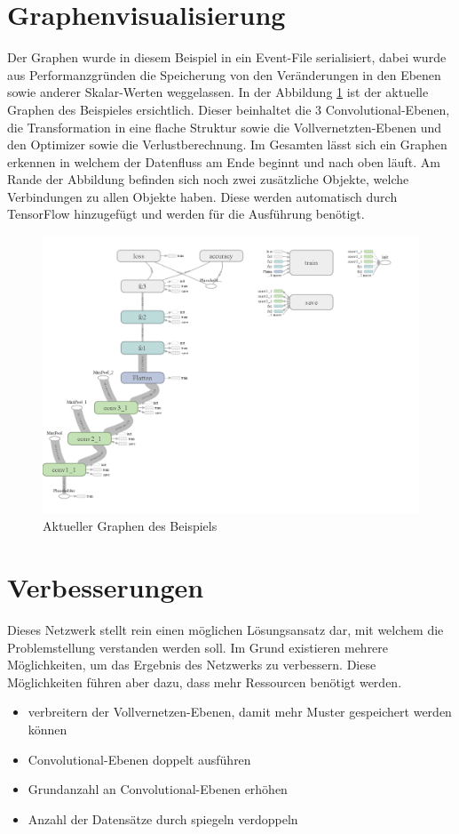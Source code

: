 \section{Graphenvisualisierung}

Der Graphen wurde in diesem Beispiel in ein Event-File serialisiert, dabei wurde aus Performanzgründen die Speicherung von den Veränderungen in den Ebenen sowie anderer Skalar-Werten weggelassen. 
In der Abbildung \ref{fig:graphDig} ist der aktuelle Graphen des Beispieles ersichtlich. 
Dieser beinhaltet die $3$ Convolutional-Ebenen, die Transformation in eine flache Struktur sowie die Vollvernetzten-Ebenen und den Optimizer sowie die Verlustberechnung. 
Im Gesamten lässt sich ein Graphen erkennen in welchem der Datenfluss am Ende beginnt und nach oben läuft. 
Am Rande der Abbildung befinden sich noch zwei zusätzliche Objekte, welche Verbindungen zu allen Objekte haben. 
Diese werden automatisch durch TensorFlow hinzugefügt und werden für die Ausführung benötigt. 
\begin{figure}
	\centering
	\includegraphics[scale=0.25]{images/graph-run.png}
	\caption{Aktueller Graphen des Beispiels}
	\label{fig:graphDig}
\end{figure}

\section{Verbesserungen}

Dieses Netzwerk stellt rein einen möglichen Lösungsansatz dar, mit welchem die Problemstellung verstanden werden soll. 
Im Grund existieren mehrere Möglichkeiten, um das Ergebnis des Netzwerks zu verbessern. 
Diese Möglichkeiten führen aber dazu, dass mehr Ressourcen benötigt werden. 
\begin{itemize}
	\item verbreitern der Vollvernetzen-Ebenen, damit mehr Muster gespeichert werden können
	\item Convolutional-Ebenen doppelt ausführen 
	\item Grundanzahl an Convolutional-Ebenen erhöhen
	\item Anzahl der Datensätze durch spiegeln verdoppeln
\end{itemize}






